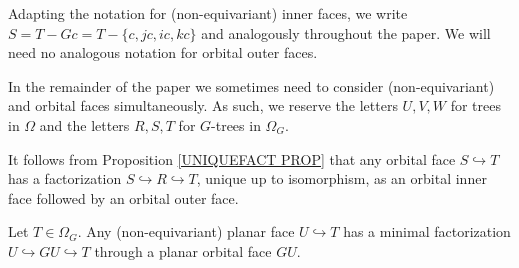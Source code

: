 \documentclass[a4paper,10pt,draft]{article}%
\begin{document}
\begin{example}
Adapting the notation for (non-equivariant) inner faces, we write
$S = T-Gc = T-\{c,jc,ic,kc\}$ and analogously throughout the paper.
We will need no analogous notation for orbital outer faces.
\end{example}


\begin{notation}\label{TREEDIFNOT NOT}
	In the remainder of the paper we sometimes need to consider (non-equivariant) and orbital faces simultaneously.
	As such, we reserve the letters $U,V,W$ for trees in $\Omega$
	and the letters $R,S,T$ for $G$-trees in $\Omega_G$.
\end{notation}


\begin{remark}\label{INNOUTORB REM}
	It follows from Proposition \ref{UNIQUEFACT PROP} that any orbital face $S \hookrightarrow T$ has a factorization
	$S \hookrightarrow R \hookrightarrow T$, unique up to isomorphism, as an orbital inner face followed by an orbital outer face.	
\end{remark}


\begin{proposition}\label{MINGFACT PROP}
	Let $T \in \Omega_G$.
	Any (non-equivariant) planar face $U \hookrightarrow T$ has a minimal factorization
	$U \hookrightarrow GU \hookrightarrow T$
	through a planar orbital face $GU$.
\end{proposition}
\end{document}
